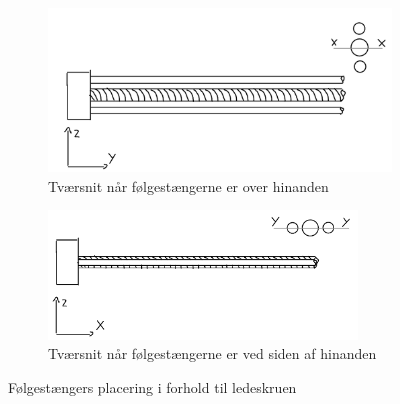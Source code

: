 \begin{figure}[H]
    \centering
    \begin{subfigure}[b]{0.45\textwidth}
    \centering
        \includegraphics[width=\textwidth]{Sections/6 Detaljeløsning/Media/Tværsnit x-x.png}
        \caption{Tværsnit når følgestængerne er over hinanden} 
        \label{fig: Flytningsbidrag1}
    \end{subfigure}
    \hfil
    \begin{subfigure}[b]{0.5\textwidth}
    \centering
        \includegraphics[width=0.9\textwidth]{Sections/6 Detaljeløsning/Media/Tværsnit y-y.png}
        \caption{Tværsnit når følgestængerne er ved siden af hinanden} 
        \label{fig: Flytningsbidrag2}
    \end{subfigure}
    \caption{Følgestængers placering i forhold til ledeskruen}
\end{figure}

